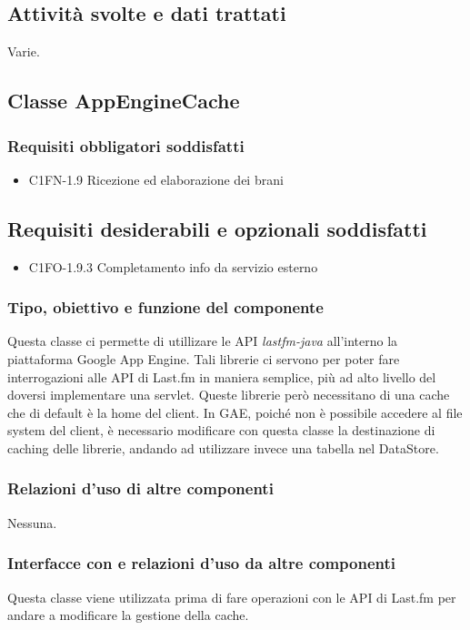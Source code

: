 \subsection*{Attivit\`a svolte e dati trattati}
Varie.

\subsection{Classe AppEngineCache}
\subsubsection*{Requisiti obbligatori soddisfatti}
\begin{itemize}
    \item C1FN-1.9 Ricezione ed elaborazione dei brani
\end{itemize}
\subsection*{Requisiti desiderabili e opzionali soddisfatti}
\begin{itemize}
    \item C1FO-1.9.3 Completamento info da servizio esterno
\end{itemize}
\subsubsection*{Tipo, obiettivo e funzione del componente}
Questa classe ci permette di utillizare le API \emph{lastfm-java} all'interno la
piattaforma Google App Engine. Tali librerie ci servono per poter fare
interrogazioni alle API di Last.fm in maniera semplice, pi\`u ad alto livello
del doversi implementare una servlet. Queste librerie per\`o necessitano di una
cache che di default \`e la home del client. In GAE, poich\'e non \`e possibile
accedere al file system del client, \`e necessario modificare con questa classe
 la destinazione di caching delle librerie, andando ad
utilizzare invece una tabella nel DataStore.
\subsubsection*{Relazioni d'uso di altre componenti}
Nessuna.
\subsubsection*{Interfacce con e relazioni d'uso da altre componenti}
Questa classe viene utilizzata prima di fare operazioni con le API di Last.fm
per andare a modificare la gestione della cache.
